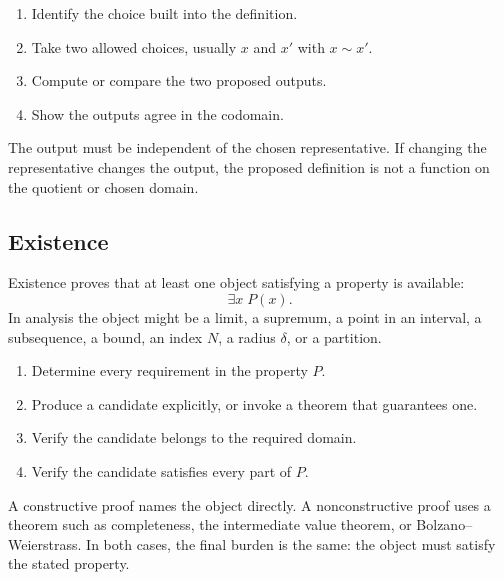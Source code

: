 \begin{remark}
\begin{enumerate}
  \item Identify the choice built into the definition.
  \item Take two allowed choices, usually $x$ and $x'$ with $x\sim x'$.
  \item Compute or compare the two proposed outputs.
  \item Show the outputs agree in the codomain.
\end{enumerate}
\end{remark}

\begin{remark}
The output must be independent of the chosen representative. If changing the
representative changes the output, the proposed definition is not a function
on the quotient or chosen domain.
\end{remark}

\subsection*{Existence}
\label{subsec:property-existence}

Existence proves that at least one object satisfying a property is available:
\[
  \exists x\;P(x).
\]
In analysis the object might be a limit, a supremum, a point in an interval,
a subsequence, a bound, an index $N$, a radius $\delta$, or a partition.

\begin{remark}
\begin{enumerate}
  \item Determine every requirement in the property $P$.
  \item Produce a candidate explicitly, or invoke a theorem that guarantees
        one.
  \item Verify the candidate belongs to the required domain.
  \item Verify the candidate satisfies every part of $P$.
\end{enumerate}
\end{remark}

\begin{remark}
A constructive proof names the object directly. A nonconstructive proof uses
a theorem such as completeness, the intermediate value theorem, or
Bolzano--Weierstrass. In both cases, the final burden is the same: the object
must satisfy the stated property.
\end{remark}

